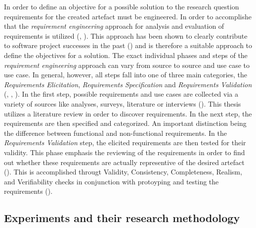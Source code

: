 In order to define an objective for a possible solution to the research question requirements for the created artefact must be engineered. In order to accomplishe that the \textit{requirement engineering} approach for analysis and evaluation of requirements is utilized (\cite{SWEBOK.2004}, \cite{Sommerville.2011}). This approach has been shown to clearly contribute to software project successes in the past (\cite{Hofmann.2001}) and is therefore a suitable approach to define the objectives for a solution. The exact individual phases and steps of the \textit{requirement engineering} approach can vary from source to source and use case to use case. In general, however, all steps fall into one of three main categories, the \textit{Requirements Elicitation}, \textit{Requirements Specification} and \textit{Requirements Validation} (\cite{SWEBOK.2004}, \cite{Sommerville.2011}, \cite{Fernandes.2009}). In the first step, possible requirements and use cases are collected via a variety of sources like analyses, surveys, literature or interviews (\cite{Sommerville.2011}). This thesis utilizes a literature review in order to discover requirements. In the next step, the requirements are then specified and categorized. An important distinction being the difference between functional and non-functional requirements. In the \textit{Requirements Validation} step, the elicited requirements are then tested for their validity. This phase emphasis the reviewing of the requirements in order to find out whether these requirements are actually representive of the desired artefact (\cite{Sommerville.2011}). This is accomplished througt Validity, Consistency, Completeness, Realism, and Verifiability checks in conjunction with protoyping and testing the requirements (\cite{Sommerville.2011}).


\subsection{Experiments and their research methodology}


